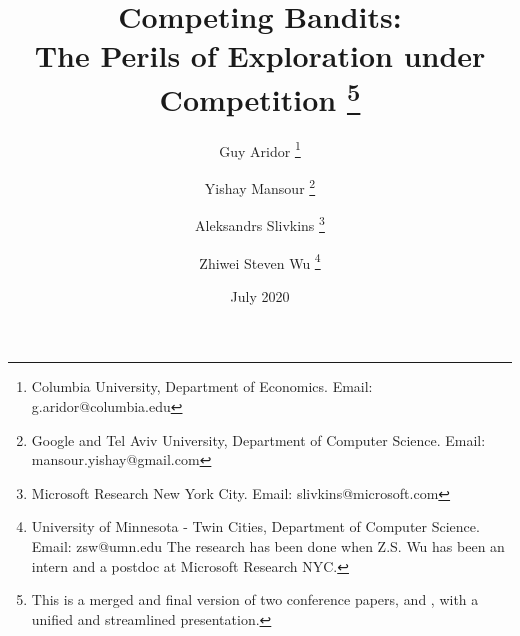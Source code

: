 \documentclass[11pt]{article}
\begin{document}

\title{Competing Bandits:\\
The Perils of Exploration under Competition%
\thanks{This is a merged and final version of two conference papers,
\citet{CompetingBandits-itcs18} and \citet{CompetingBandits-ec19},
with a unified and streamlined presentation.}}

\author{Guy Aridor%
\footnote{Columbia University, Department of Economics. Email: g.aridor@columbia.edu}
\and
Yishay Mansour%
\footnote{Google and Tel Aviv University, Department of Computer Science. Email: mansour.yishay@gmail.com}
\and
Aleksandrs Slivkins%
\footnote{Microsoft Research New York City. Email: slivkins@microsoft.com}
\and
Zhiwei Steven Wu%
\footnote{University of Minnesota - Twin Cities, Department of Computer Science. Email: zsw@umn.edu\newline
The research has been done when Z.S. Wu has been an intern and a postdoc at Microsoft Research NYC.
}}
\date{July 2020}
\maketitle
\end{document}
